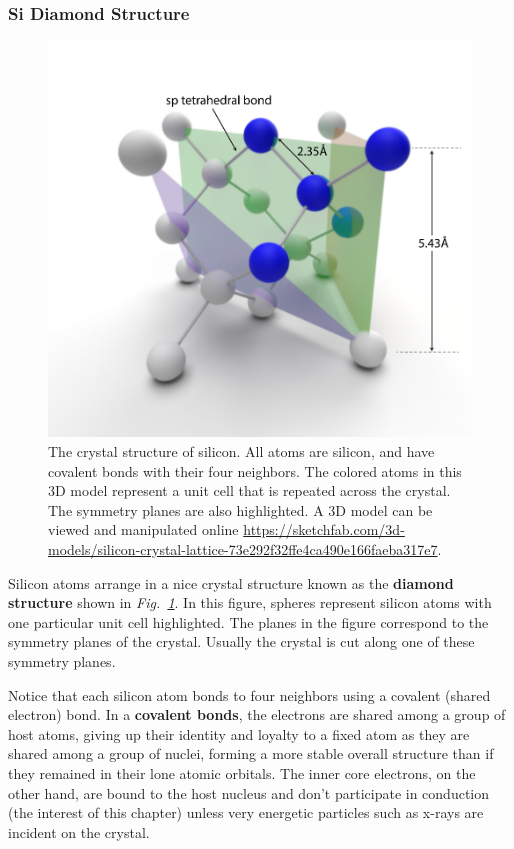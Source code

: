 \subsubsection{Si Diamond Structure}
\begin{figure}
\centering
\includegraphics[width=\columnwidth]{silicon_crysal_label.pdf}
\caption{The crystal structure of silicon.  All atoms are silicon, and have covalent bonds with their four neighbors.  The colored atoms in this 3D model represent a unit cell that is repeated across the crystal.  The symmetry planes are also highlighted.  A 3D model can be viewed and manipulated online \url{https://sketchfab.com/3d-models/silicon-crystal-lattice-73e292f32ffe4ca490e166faeba317e7}.}
\label{fig:silicon_crysal}
\end{figure}
Silicon atoms arrange in a nice crystal structure known as the \textbf{diamond structure} shown in \emph{Fig.~\ref{fig:silicon_crysal}}.  In this figure, spheres represent silicon atoms with one particular unit cell highlighted.  The planes in the figure correspond to the symmetry planes of the crystal.  Usually the crystal is cut along one of these symmetry planes.

Notice that each silicon atom bonds to four neighbors using a covalent (shared electron) bond.  In a \textbf{covalent bonds}, the electrons are shared among a group of host atoms, giving up their identity and loyalty to a fixed atom as they are shared among a group of nuclei, forming a more stable overall structure than if they remained in their lone atomic orbitals.  The inner core electrons, on the other hand, are bound to the host nucleus and don't participate in conduction (the interest of this chapter) unless very energetic particles such as x-rays are incident on the crystal.
\newpage
